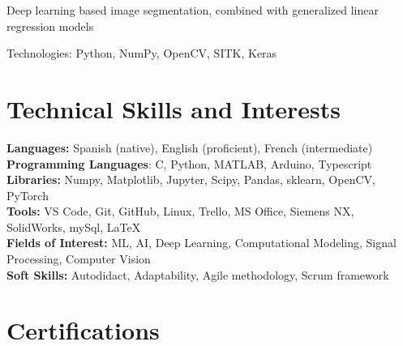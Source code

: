 \documentclass{resume}
\begin{document}
    \resumeItemListStart
    \item {Deep learning based image segmentation, combined with generalized linear regression models}
    \item {Technologies: Python, NumPy, OpenCV, SITK, Keras}
    \resumeItemListEnd

    \resumeSubHeadingListEnd


    \vspace{-5mm}


    \section{\textbf{Technical Skills and Interests}} \label{sec:skills}
    \begin{itemize}[leftmargin=0.05in, label={}]
        \small{\item{
            \textbf{Languages:}{ Spanish (native), English (proficient), French (intermediate) } \\
            \textbf{Programming Languages}{: C, Python, MATLAB, Arduino, Typescript } \\
            \textbf{Libraries:}{ Numpy, Matplotlib, Jupyter, Scipy, Pandas, sklearn, OpenCV, PyTorch}\\
            \textbf{Tools:}{ VS Code, Git, GitHub, Linux, Trello, MS Office, Siemens NX, SolidWorks, mySql,
                \LaTeX} \\
            \textbf{Fields of Interest:}
            {ML, AI, Deep Learning, Computational Modeling, Signal Processing, Computer Vision} \\
            \textbf{Soft Skills:}{ Autodidact, Adaptability, Agile methodology, Scrum framework} \\
        }}
    \end{itemize}




    \section{\textbf{Certifications}} \label{sec:certifications}
    \vspace{-0.4mm}
    \resumeSubHeadingListStart






    \resumeSubHeadingListEnd


\end{document}
